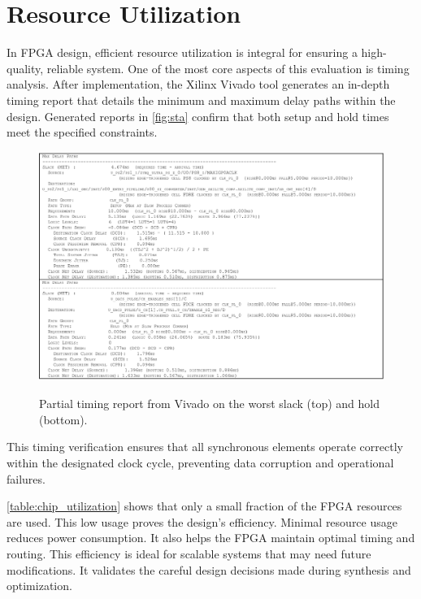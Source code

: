 \section{Resource Utilization}

In FPGA design, efficient resource utilization is integral for ensuring a high-quality, reliable system. One of the most core aspects of this evaluation is timing analysis. After implementation, the Xilinx Vivado tool generates an in-depth timing report that details the minimum and maximum delay paths within the design. Generated reports in \autoref{fig:sta} confirm that both setup and hold times meet the specified constraints.
\begin{figure}[ht]
    \centering
    \includegraphics[width=1\linewidth]{figures/timimg_report.png}
    \caption{Partial timing report from Vivado on the worst slack (top) and hold (bottom).}
    \setlength{\abovecaptionskip}{5pt}    %
    \setlength{\belowcaptionskip}{5pt}    %
    \label{fig:sta}
\end{figure}
This timing verification ensures that all synchronous elements operate correctly within the designated clock cycle, preventing data corruption and operational failures. 

\autoref{table:chip_utilization} shows that only a small fraction of the FPGA resources are used. This low usage proves the design's efficiency. Minimal resource usage reduces power consumption. It also helps the FPGA maintain optimal timing and routing. This efficiency is ideal for scalable systems that may need future modifications. It validates the careful design decisions made during synthesis and optimization.

